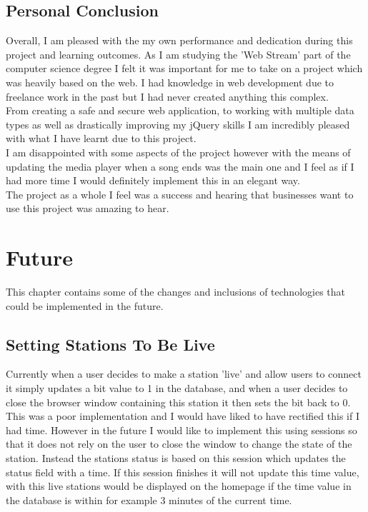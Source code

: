 \documentclass[a4paper, 12pt]{report}
\begin{document}
\section{Personal Conclusion}
Overall, I am pleased with the my own performance and dedication during this project and learning outcomes. As I am studying the 'Web Stream' part of the computer science degree I felt it was important for me to take on a project which was heavily based on the web. I had knowledge in web development due to freelance work in the past but I had never created anything this complex. \\
From creating a safe and secure web application, to working with multiple data types as well as drastically improving my jQuery skills I am incredibly pleased with what I have learnt due to this project.\\
I am disappointed with some aspects of the project however with the means of updating the media player when a song ends was the main one and I feel as if I had more time I would definitely implement this in an elegant way.\\
The project as a whole I feel was a success and hearing that businesses want to use this project was amazing to hear.  

\chapter{Future}
This chapter contains some of the changes and inclusions of technologies that could be implemented in the future.

\section{Setting Stations To Be Live}
Currently when a user decides to make a station 'live' and allow users to connect it simply updates a bit value to 1 in the database, and when a user decides to close the browser window containing this station it then sets the bit back to 0. This was a poor implementation and I would have liked to have rectified this if I had time. However in the future I would like to implement this using sessions so that it does not rely on the user to close the window to change the state of the station. Instead the stations status is based on this session which updates the status field with a time. If this session finishes it will not update this time value, with this live stations would be displayed on the homepage if the time value in the database is within for example 3 minutes of the current time. 
 
\end{document}
